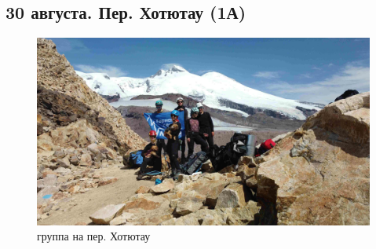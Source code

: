 \subsection{30 августа. Пер. Хотютау (1А)}

\begin{figure}[h]
	\centering
	\includegraphics[width=0.7\linewidth]{../pics/DJI_0899}
	\caption{группа на пер. Хотютау}
	\label{fig:hotyutau_1}
\end{figure}
\newpage